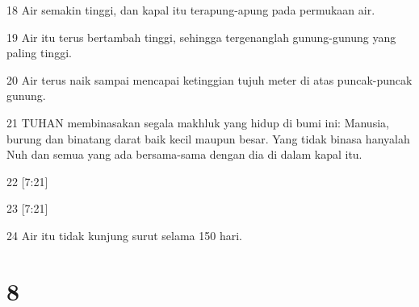 \par 18 Air semakin tinggi, dan kapal itu terapung-apung pada permukaan air.
\par 19 Air itu terus bertambah tinggi, sehingga tergenanglah gunung-gunung yang paling tinggi.
\par 20 Air terus naik sampai mencapai ketinggian tujuh meter di atas puncak-puncak gunung.
\par 21 TUHAN membinasakan segala makhluk yang hidup di bumi ini: Manusia, burung dan binatang darat baik kecil maupun besar. Yang tidak binasa hanyalah Nuh dan semua yang ada bersama-sama dengan dia di dalam kapal itu.
\par 22 [7:21]
\par 23 [7:21]
\par 24 Air itu tidak kunjung surut selama 150 hari.

\chapter{8}

